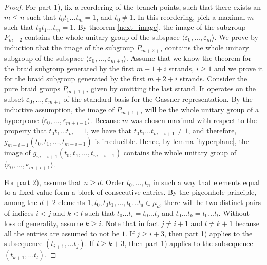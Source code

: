 \documentclass{article}
\theoremstyle{definition}
\begin{document}
	\begin{proof}
		For part 1), fix a reordering of the branch points, such that there exists an $m \leqslant n$ such that $t_0 t_1 \ldots t_m = 1$, and $t_0 \neq 1$. In this reordering, pick a maximal $m$ such that $t_0 t_1 \ldots t_m = 1$. By theorem \ref{next_image}, the image of the subgroup $P_{m+2}$ %
		contains the whole unitary group of the subspace $\langle \varepsilon_0, \ldots, \varepsilon_m \rangle$. We prove by induction that the image of the subgroup $P_{m+2+i}$ contains the whole unitary subgroup of the subspace $\langle \varepsilon_0, \ldots, \varepsilon_{m+i} \rangle$. Assume that we know the theorem for the braid subgroup generated by the first $m+1+i$ strands, $i \geqslant 1$ and we prove it for the braid subgroup generated by the first $m+2+i$ strands. Consider the pure braid groups $P_{m+1+i}$ given by omitting the last strand. It operates on the subset $\varepsilon_0, \ldots, \varepsilon_{m+i}$ of the standard basis for the Gassner representation. By the inductive assumption, the image of $P_{m+1+i}$ will be the whole unitary group of a hyperplane $\langle \varepsilon_0, \ldots, \varepsilon_{m+i-1} \rangle$. Because $m$ was chosen maximal with respect to the property that $t_0 t_1 \ldots t_m = 1$, we have that $t_0 t_1 \ldots t_{m+i+1} \neq 1$, and therefore, $\bar{g}_{m+i+1}(t_0, t_1, \ldots, t_{m+i+1})$ is irreducible. Hence, by lemma \ref{hyperplane}, the image of $\bar{g}_{m+i+1}(t_0, t_1, \ldots, t_{m+i+1})$ contains the whole unitary group of $\langle \varepsilon_0, \ldots, \varepsilon_{m+i+1} \rangle$. \par 
		For part 2), assume that $n \geq d$. Order $t_0, \ldots, t_n$ in such a way that elements equal to a fixed value form a block of consecutive entries. By the pigeonhole principle, among the $d+2$ elements $1, t_0, t_0t_1, \ldots, t_0 \ldots t_d \in \mu_d$, there will be two distinct pairs of indices $i < j$ and $k < l$ such that $t_0 \ldots t_i = t_0 \ldots t_j$ and $t_0 \ldots t_k = t_0 \ldots t_l$. Without loss of generality, assume $k \geqslant i$. Note that in fact $j \neq i+1$ and $l \neq k+1$ because all the entries are assumed to not be $1$. If $j \geq i + 3$, then part 1) applies to the subsequence $(t_{i+1}, \ldots t_j)$. If $l \geq k+3$, then part 1) applies to the subsequence $(t_{k+1}, \ldots t_l)$. \par 

\end{proof}
\end{document}
